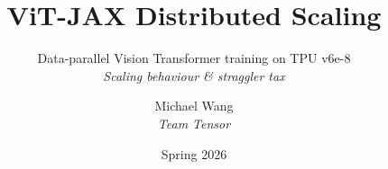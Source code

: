 \documentclass[aspectratio=169,10pt]{beamer}
\title{ViT-JAX Distributed Scaling}
\subtitle{Data-parallel Vision Transformer training on TPU v6e-8\\\textit{Scaling behaviour \& straggler tax}}
\author{Michael Wang \\ \textit{\small Team Tensor}}
\institute{CS 390 — Distributed Systems · Duke University}
\date{Spring 2026}
\begin{document}
\begin{frame}[plain]
  \titlepage
\end{frame}

\end{document}
